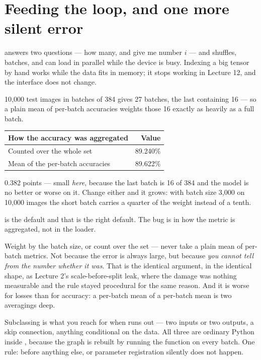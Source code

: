 \documentclass[11pt,a4paper]{article}
\begin{document}
\section{Feeding the loop, and one more silent error}

 answers two questions --- how many, and give me number $i$ ---
and  shuffles, batches, and can load in parallel while the
device is busy. Indexing a big tensor by hand works while the data fits in
memory; it stops working in Lecture 12, and the interface does not change.

\begin{failbox}[title={Failure condition --- the last batch is short}]
10{,}000 test images in batches of 384 gives 27 batches, the last containing
16 --- so a plain mean of per-batch accuracies weights those 16 exactly as
heavily as a full batch.

\begin{center}
\small
\begin{tabular}{lr}
\toprule
\textbf{How the accuracy was aggregated} & \textbf{Value} \\
\midrule
Counted over the whole set & 89.240\% \\
Mean of the per-batch accuracies & 89.622\% \\
\bottomrule
\end{tabular}
\end{center}

0.382 points --- small \emph{here}, because the last batch is 16 of 384 and the
model is no better or worse on it. Change either and it grows: with batch size
3{,}000 on 10{,}000 images the short batch carries a quarter of the weight
instead of a tenth.

 is the default and that is the right default. The bug is
in how the metric is aggregated, not in the loader.
\end{failbox}

Weight by the batch size, or count over the set --- never take a plain mean of
per-batch metrics. Not because the error is always large, but because
\emph{you cannot tell from the number whether it was}. That is the identical
argument, in the identical shape, as Lecture 2's scale-before-split leak, where
the damage was nothing measurable and the rule stayed procedural for the same
reason. And it is worse for losses than for accuracy: a per-batch mean of a
per-batch mean is two averagings deep.

Subclassing  is what you reach for when  runs
out --- two inputs or two outputs, a skip connection, anything conditional on
the data. All three are ordinary Python inside , because the
graph is rebuilt by running the function on every batch. One rule:
 before anything else, or parameter registration
silently does not happen.
\end{document}

